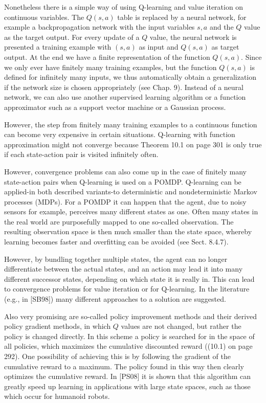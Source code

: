 \documentclass[10pt]{article}
\begin{document}
Nonetheless there is a simple way of using Q-learning and value iteration on continuous variables. The $Q(s, a)$ table is replaced by a neural network, for example a backpropagation network with the input variables $s, a$ and the $Q$ value as the target output. For every update of a $Q$ value, the neural network is presented a training example with $(s, a)$ as input and $Q(s, a)$ as target output. At the end we have a finite representation of the function $Q(s, a)$. Since we only ever have finitely many training examples, but the function $Q(s, a)$ is defined for infinitely many inputs, we thus automatically obtain a generalization if the network size is chosen appropriately (see Chap. 9). Instead of a neural network, we can also use another supervised learning algorithm or a function approximator such as a support vector machine or a Gaussian process.

However, the step from finitely many training examples to a continuous function can become very expensive in certain situations. Q-learning with function approximation might not converge because Theorem 10.1 on page 301 is only true if each state-action pair is visited infinitely often.

However, convergence problems can also come up in the case of finitely many state-action pairs when Q-learning is used on a POMDP. Q-learning can be applied-in both described variants-to deterministic and nondeterministic Markov processes (MDPs). For a POMDP it can happen that the agent, due to noisy sensors for example, perceives many different states as one. Often many states in the real world are purposefully mapped to one so-called observation. The resulting observation space is then much smaller than the state space, whereby learning becomes faster and overfitting can be avoided (see Sect. 8.4.7).

However, by bundling together multiple states, the agent can no longer differentiate between the actual states, and an action may lead it into many different successor states, depending on which state it is really in. This can lead to convergence problems for value iteration or for Q-learning. In the literature (e.g., in [SB98]) many different approaches to a solution are suggested.

Also very promising are so-called policy improvement methods and their derived policy gradient methods, in which $Q$ values are not changed, but rather the policy is changed directly. In this scheme a policy is searched for in the space of all policies, which maximizes the cumulative discounted reward ((10.1) on page 292). One possibility of achieving this is by following the gradient of the cumulative reward to a maximum. The policy found in this way then clearly optimizes the cumulative reward. In [PS08] it is shown that this algorithm can greatly speed up learning in applications with large state spaces, such as those which occur for humanoid robots.
\end{document}
